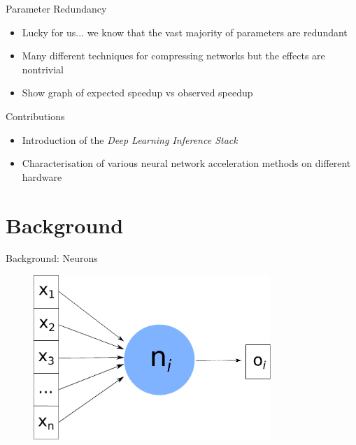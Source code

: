 \documentclass{beamer}
\begin{document}
\begin{frame}{Parameter Redundancy}

\begin{itemize}
	\item Lucky for us... we know that the vast majority of parameters are redundant 
    \item Many different techniques for compressing networks but the effects are nontrivial
    \item Show graph of expected speedup vs observed speedup
\end{itemize}

\end{frame}


\begin{frame}{Contributions}
    
    \begin{itemize}
        \item Introduction of the \textit{Deep Learning Inference Stack}
        \item Characterisation of various neural network acceleration methods on different hardware
    \end{itemize}
    
\end{frame}


\section{Background}

\begin{frame}{Background: Neurons}

\begin{figure}
    \centering
    \includegraphics[width=0.8\textwidth]{images/neuron.pdf}
\end{figure}

\end{frame}
\end{document}
